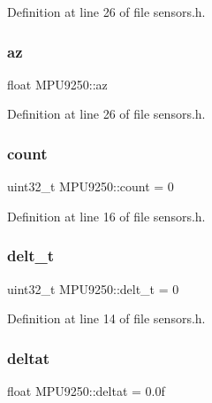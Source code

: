 Definition at line 26 of file sensors.\+h.

\mbox{\label{classMPU9250_a8ab7a335476e40a26aba80f867ac7da9}} 
\subsubsection{\texorpdfstring{az}{az}}
{\footnotesize\ttfamily float M\+P\+U9250\+::az}



Definition at line 26 of file sensors.\+h.

\mbox{\label{classMPU9250_a9d231520d019ba7879c60ef7b72707a5}} 
\subsubsection{\texorpdfstring{count}{count}}
{\footnotesize\ttfamily uint32\+\_\+t M\+P\+U9250\+::count = 0}



Definition at line 16 of file sensors.\+h.

\mbox{\label{classMPU9250_a4d6b6338685120de2e21aa30d9d89389}} 
\subsubsection{\texorpdfstring{delt\+\_\+t}{delt\_t}}
{\footnotesize\ttfamily uint32\+\_\+t M\+P\+U9250\+::delt\+\_\+t = 0}



Definition at line 14 of file sensors.\+h.

\mbox{\label{classMPU9250_a1e53d31ab289b64a0d6393b17e8b807e}} 
\subsubsection{\texorpdfstring{deltat}{deltat}}
{\footnotesize\ttfamily float M\+P\+U9250\+::deltat = 0.\+0f}



